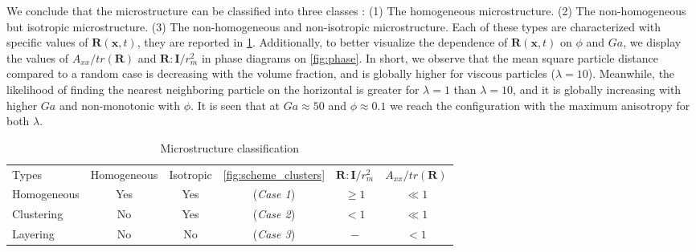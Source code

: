 We conclude that the microstructure can be classified into three classes :
(1) The homogeneous microstructure. 
(2) The non-homogeneous but isotropic microstructure. 
(3) The non-homogeneous and non-isotropic microstructure. 
Each of these types are characterized with specific values of $\textbf{R}(\textbf{x},t)$, they are reported in \ref{tab:microstructure}. 
Additionally, to better visualize the dependence of $\textbf{R}(\textbf{x},t)$ on $\phi$ and $Ga$, we display the values of $A_{xx}/tr(\textbf{R})$ and $\textbf{R}:\textbf{I}/r_m^2$ in phase diagrams on \ref{fig:phase}.
In short, we observe that the mean square particle distance compared to a random case is decreasing with the volume fraction, and is globally higher for viscous particles ($\lambda = 10$).
Meanwhile, the likelihood of finding the nearest neighboring particle on the horizontal is greater for $\lambda=1$ than $\lambda = 10$, and it is globally increasing with higher $Ga$ and non-monotonic with $\phi$. 
It is seen that at $Ga \approx 50$ and $\phi \approx 0.1$ we reach the configuration with the maximum anisotropy for both $\lambda$. 
\begin{table}[h!]
    \caption{Microstructure classification}
    \label{tab:microstructure}
    \centering
    \begin{tabular}{|lccccc|} \hline
        Types & Homogeneous & Isotropic & \ref{fig:scheme_clusters} & $\textbf{R}:\textbf{I}/r_m^2$ & $A_{xx}/tr(\textbf{R})$ \\
        Homogeneous & Yes & Yes &(\textit{Case 1}) & $\geq 1$ & $\ll 1$ \\
        Clustering &  No & Yes  &(\textit{Case 2}) & $ < 1$ & $\ll 1$ \\
        Layering &    No & No  &(\textit{Case 3}) & $ - $ & $< 1$\\ \hline
    \end{tabular}
\end{table}

